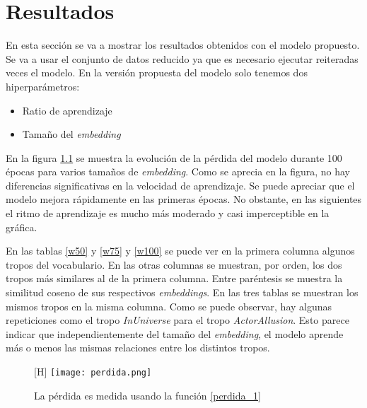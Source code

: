 \chapter{Resultados}

En esta sección se va a mostrar los resultados obtenidos con el modelo propuesto. Se va a usar el conjunto de datos reducido ya que es necesario ejecutar reiteradas veces el modelo. En la versión
propuesta del modelo solo tenemos dos hiperparámetros:
\begin{itemize}
  \item Ratio de aprendizaje
  \item Tamaño del \textit{embedding}
\end{itemize}

En la figura \ref{embedding_size} se muestra la evolución de la pérdida del modelo durante 100 épocas para varios tamaños de \textit{embedding}. Como se aprecia en la figura, no hay diferencias significativas
en la velocidad de aprendizaje. Se puede apreciar que el modelo mejora rápidamente en las primeras épocas. No obstante, en las siguientes el ritmo de aprendizaje es mucho más moderado y casi imperceptible
en la gráfica.

En las tablas \ref{w50} y \ref{w75} y \ref{w100} se puede ver en la primera columna algunos tropos del vocabulario. En las otras columnas se muestran, por orden, los dos tropos más similares
al de la primera columna. Entre paréntesis se muestra la similitud coseno de sus respectivos \textit{embeddings}. En las tres tablas se muestran los mismos tropos en la misma columna. Como se puede observar,
hay algunas repeticiones como el tropo \textit{InUniverse} para el tropo \textit{ActorAllusion}. Esto parece indicar que independientemente del tamaño del \textit{embedding}, el modelo aprende más o menos las mismas
relaciones entre los distintos tropos.

\begin{figure}\label{embedding_size}[H]
  \texttt{[image: perdida.png]}
  \centering
  \caption{La pérdida es medida usando la función \ref{perdida_1}}
\end{figure}

\begin{center}
  \begin{table}
  \caption{Tropos similares usando \textit{embeddings} de tamaño 50}
  \label{w50}
  \end{table}
\end{center}


